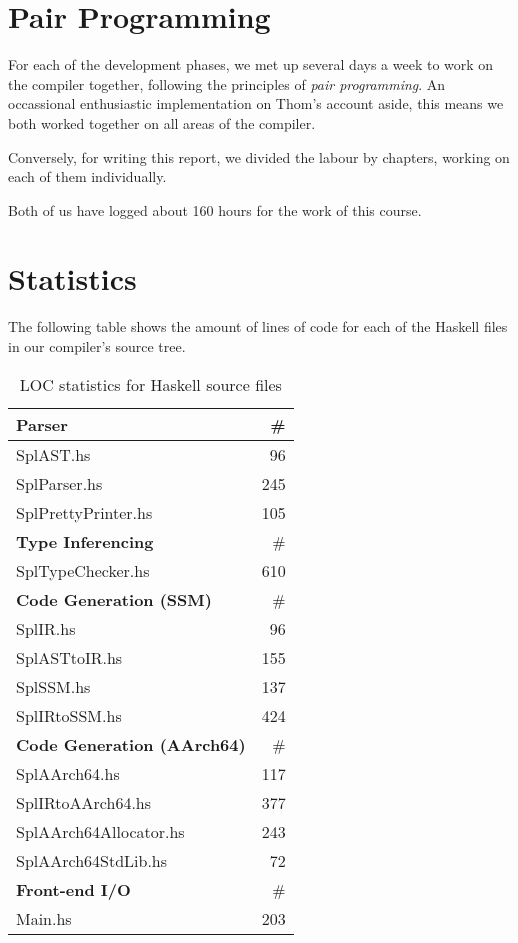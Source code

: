 \section{Pair Programming}

For each of the development phases, we met up several days a week to work on the compiler together, following the principles of \emph{pair programming}.
An occassional enthusiastic implementation on Thom's account aside, this means we both worked together on all areas of the compiler.

Conversely, for writing this report, we divided the labour by chapters, working on each of them individually.

Both of us have logged about 160 hours for the work of this course.


\section{Statistics}

The following table shows the amount of lines of code for each of the Haskell files in our compiler's source tree.

\begin{table}[ht!]
	\centering
	\begin{tabular}{|l|r|}
		\hline
		\textbf{Parser} 	& \# \\
		\hline
		SplAST.hs 			& 96 \\
		SplParser.hs 		& 245 \\
		SplPrettyPrinter.hs & 105 \\

		\hline
		\textbf{Type Inferencing} & \# \\
		\hline
		SplTypeChecker.hs 	& 610 \\

		\hline
		\textbf{Code Generation (SSM)} & \# \\
		\hline
		SplIR.hs 			& 96 \\
		SplASTtoIR.hs 		& 155 \\
		SplSSM.hs 			& 137 \\
		SplIRtoSSM.hs 		& 424 \\

		\hline
		\textbf{Code Generation (AArch64)} & \# \\
		\hline
		SplAArch64.hs 		& 117 \\
		SplIRtoAArch64.hs 	& 377 \\
		SplAArch64Allocator.hs & 243 \\
		SplAArch64StdLib.hs & 72 \\

		\hline
		\textbf{Front-end I/O} & \# \\
		\hline
		Main.hs 			& 203 \\
		\hline
	\end{tabular}
	\caption{LOC statistics for Haskell source files}
\end{table}
